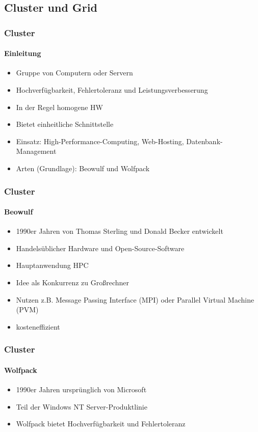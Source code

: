 \subsection{Cluster und Grid}
\begin{frame}
  \frametitle{Cluster}
  \framesubtitle{Einleitung}
  \begin{itemize}
    \item Gruppe von Computern oder Servern
    \item Hochverfügbarkeit, Fehlertoleranz und Leistungsverbesserung
    \item In der Regel homogene HW
    \item Bietet einheitliche Schnittstelle
    \item Einsatz: High-Performance-Computing, Web-Hosting, Datenbank-Management
    \item Arten (Grundlage): Beowulf und Wolfpack 
  \end{itemize}
\end{frame}

\begin{frame}
  \frametitle{Cluster}
  \framesubtitle{Beowulf}
  \begin{itemize}
    \item 1990er Jahren von Thomas Sterling und Donald Becker entwickelt
    \item Handelsüblicher Hardware und Open-Source-Software
    \item Hauptanwendung HPC
    \item Idee als Konkurrenz zu Großrechner
    \item Nutzen z.B. Message Passing Interface (MPI) oder Parallel Virtual Machine (PVM)
    \item kosteneffizient
  \end{itemize}
\end{frame}

\begin{frame}
  \frametitle{Cluster}
  \framesubtitle{Wolfpack}
  \begin{itemize}
    \item 1990er Jahren ursprünglich von Microsoft
    \item Teil der Windows NT Server-Produktlinie
    \item Wolfpack bietet Hochverfügbarkeit und Fehlertoleranz
  \end{itemize}
\end{frame}

